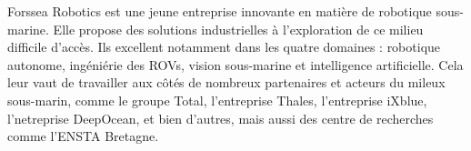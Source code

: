 Forssea Robotics est une jeune entreprise innovante en matière de robotique sous-marine. Elle propose des solutions industrielles à l'exploration de ce milieu difficile d'accès. Ils excellent notamment dans les quatre domaines : robotique autonome, ingéniérie des ROVs, vision sous-marine et intelligence artificielle. Cela leur vaut de travailler aux côtés de nombreux partenaires et acteurs du mileux sous-marin, comme le groupe Total, l'entreprise Thales, l'entreprise iXblue, l'netreprise DeepOcean, et bien d'autres, mais aussi des centre de recherches comme l'ENSTA Bretagne.